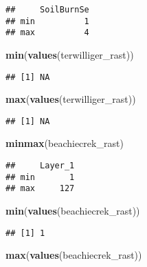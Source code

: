\documentclass[
]{article}
\newenvironment{Shaded}{\begin{snugshade}}{\end{snugshade}}
\newcommand{\FunctionTok}[1]{\textcolor[rgb]{0.13,0.29,0.53}{\textbf{#1}}}
\newcommand{\NormalTok}[1]{#1}
\begin{document}
\begin{verbatim}
##     SoilBurnSe
## min          1
## max          4
\end{verbatim}

\begin{Shaded}
\begin{Highlighting}[]
\FunctionTok{min}\NormalTok{(}\FunctionTok{values}\NormalTok{(terwilliger\_rast))}
\end{Highlighting}
\end{Shaded}

\begin{verbatim}
## [1] NA
\end{verbatim}

\begin{Shaded}
\begin{Highlighting}[]
\FunctionTok{max}\NormalTok{(}\FunctionTok{values}\NormalTok{(terwilliger\_rast))}
\end{Highlighting}
\end{Shaded}

\begin{verbatim}
## [1] NA
\end{verbatim}

\begin{Shaded}
\begin{Highlighting}[]
\FunctionTok{minmax}\NormalTok{(beachiecrek\_rast)}
\end{Highlighting}
\end{Shaded}

\begin{verbatim}
##     Layer_1
## min       1
## max     127
\end{verbatim}

\begin{Shaded}
\begin{Highlighting}[]
\FunctionTok{min}\NormalTok{(}\FunctionTok{values}\NormalTok{(beachiecrek\_rast))}
\end{Highlighting}
\end{Shaded}

\begin{verbatim}
## [1] 1
\end{verbatim}

\begin{Shaded}
\begin{Highlighting}[]
\FunctionTok{max}\NormalTok{(}\FunctionTok{values}\NormalTok{(beachiecrek\_rast))}
\end{Highlighting}
\end{Shaded}
\end{document}
